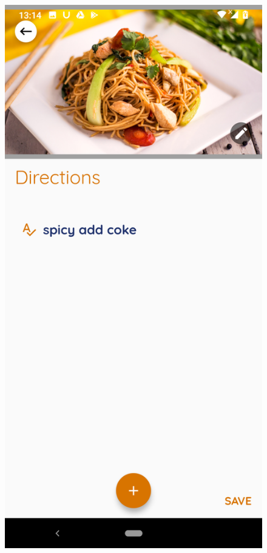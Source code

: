 \documentclass{article}
\begin{document}
\begin{figure}[h!]
    \includegraphics[scale=0.1]{Images/frienod_dire.jpg}

\end{figure}
\end{document}
